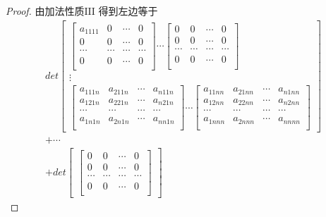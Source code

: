 \documentclass[twoside,a4paper,CCT]{cctart}   %
\begin{document}
\begin{proof}
由加法性质$\textrm{III}$ 得到左边等于
 \begin{equation}
 \begin{aligned}
det\begin{bmatrix}
  \begin{bmatrix}
   a_{1111}& 0&\cdots&0\\
   0& 0&\cdots&0\\
  \cdots& \cdots&\cdots&\cdots \\
0& 0&\cdots&0\\
\end{bmatrix}
\cdots
 \begin{bmatrix}
   0& 0&\cdots&0\\
   0& 0&\cdots&0\\
  \cdots& \cdots&\cdots&\cdots \\
0& 0&\cdots&0\\
\end{bmatrix}\\
\vdots\\
\begin{bmatrix}
  a_{111n}& a_{211n}&\cdots&a_{n11n}\\
  a_{121n}& a_{221n}&\cdots&a_{n21n}\\
  \cdots& \cdots&\cdots&\cdots \\
  a_{1n1n}& a_{2n1n}&\cdots&a_{nn1n}\\
  \end{bmatrix}
\cdots
\begin{bmatrix}
  a_{11nn}& a_{21nn}&\cdots&a_{n1nn}\\
  a_{12nn}& a_{22nn}&\cdots&a_{n2nn}\\
  \cdots& \cdots&\cdots&\cdots \\
   a_{1nnn}& a_{2nnn}&\cdots&a_{nnnn}\\
\end{bmatrix}
\end{bmatrix}\\
+ \cdots\\
+det\begin{bmatrix}
  \begin{bmatrix}
   0& 0&\cdots&0\\
   0& 0&\cdots&0\\
  \cdots& \cdots&\cdots&\cdots \\
0& 0&\cdots&0\\
\end{bmatrix}

\end{bmatrix}
\end{aligned}
\end{equation}
\end{proof}
\end{document}

